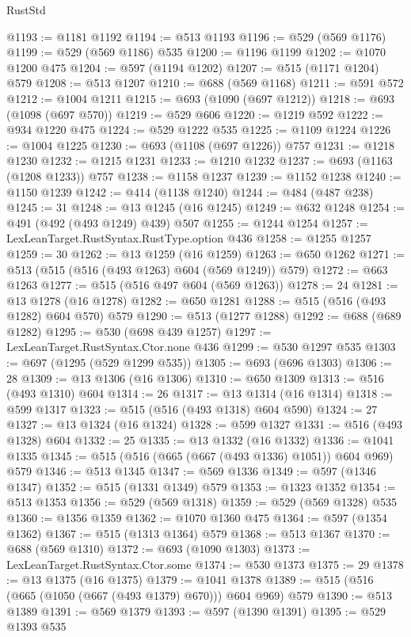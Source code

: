 \begin{lexlean}{RustStd}
\begin{coremodule}
{\begin{coremodule}
{{{{{{{{{{{{{@1193 := @1181 @1192
@1194 := @513 @1193
@1196 := @529 (@569 @1176)
@1199 := @529 (@569 @1186) @535
@1200 := @1196 @1199
@1202 := @1070 @1200 @475
@1204 := @597 (@1194 @1202)
@1207 := @515 (@1171 @1204) @579
@1208 := @513 @1207
@1210 := @688 (@569 @1168)
@1211 := @591 @572
@1212 := @1004 @1211
@1215 := @693 (@1090 (@697 @1212))
@1218 := @693 (@1098 (@697 @570))
@1219 := @529 @606
@1220 := @1219 @592
@1222 := @934 @1220 @475
@1224 := @529 @1222 @535
@1225 := @1109 @1224
@1226 := @1004 @1225
@1230 := @693 (@1108 (@697 @1226)) @757
@1231 := @1218 @1230
@1232 := @1215 @1231
@1233 := @1210 @1232
@1237 := @693 (@1163 (@1208 @1233)) @757
@1238 := @1158 @1237
@1239 := @1152 @1238
@1240 := @1150 @1239
@1242 := @414 (@1138 @1240)
@1244 := @484 (@487 @238)
@1245 := 31
@1248 := @13 @1245 (@16 @1245)
@1249 := @632 @1248
@1254 := @491 (@492 (@493 @1249) @439) @507
@1255 := @1244 @1254
@1257 := LexLeanTarget.RustSyntax.RustType.option @436
@1258 := @1255 @1257
@1259 := 30
@1262 := @13 @1259 (@16 @1259)
@1263 := @650 @1262
@1271 := @513 (@515 (@516 (@493 @1263) @604 (@569 @1249)) @579)
@1272 := @663 @1263
@1277 := @515 (@516 @497 @604 (@569 @1263))
@1278 := 24
@1281 := @13 @1278 (@16 @1278)
@1282 := @650 @1281
@1288 := @515 (@516 (@493 @1282) @604 @570) @579
@1290 := @513 (@1277 @1288)
@1292 := @688 (@689 @1282)
@1295 := @530 (@698 @439 @1257)
@1297 := LexLeanTarget.RustSyntax.Ctor.none @436
@1299 := @530 @1297 @535
@1303 := @697 (@1295 (@529 @1299 @535))
@1305 := @693 (@696 @1303)
@1306 := 28
@1309 := @13 @1306 (@16 @1306)
@1310 := @650 @1309
@1313 := @516 (@493 @1310) @604
@1314 := 26
@1317 := @13 @1314 (@16 @1314)
@1318 := @599 @1317
@1323 := @515 (@516 (@493 @1318) @604 @590)
@1324 := 27
@1327 := @13 @1324 (@16 @1324)
@1328 := @599 @1327
@1331 := @516 (@493 @1328) @604
@1332 := 25
@1335 := @13 @1332 (@16 @1332)
@1336 := @1041 @1335
@1345 := @515 (@516 (@665 (@667 (@493 @1336) @1051)) @604 @969) @579
@1346 := @513 @1345
@1347 := @569 @1336
@1349 := @597 (@1346 @1347)
@1352 := @515 (@1331 @1349) @579
@1353 := @1323 @1352
@1354 := @513 @1353
@1356 := @529 (@569 @1318)
@1359 := @529 (@569 @1328) @535
@1360 := @1356 @1359
@1362 := @1070 @1360 @475
@1364 := @597 (@1354 @1362)
@1367 := @515 (@1313 @1364) @579
@1368 := @513 @1367
@1370 := @688 (@569 @1310)
@1372 := @693 (@1090 @1303)
@1373 := LexLeanTarget.RustSyntax.Ctor.some
@1374 := @530 @1373
@1375 := 29
@1378 := @13 @1375 (@16 @1375)
@1379 := @1041 @1378
@1389 := @515 (@516 (@665 (@1050 (@667 (@493 @1379) @670))) @604 @969) @579
@1390 := @513 @1389
@1391 := @569 @1379
@1393 := @597 (@1390 @1391)
@1395 := @529 @1393 @535
}}}}}}}}}}}}}
\end{coremodule}}
\end{coremodule}
\end{lexlean}
